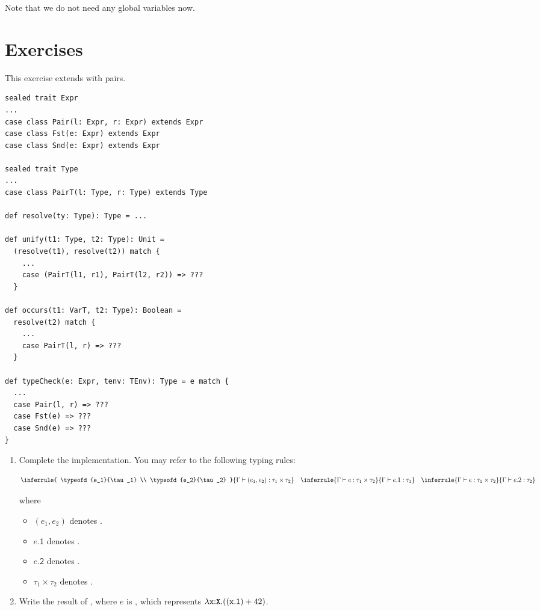 Note that we do not need any global variables now.

\section{Exercises}

\begin{exercise}

This exercise extends \Lang with pairs.

\begin{verbatim}
sealed trait Expr
...
case class Pair(l: Expr, r: Expr) extends Expr
case class Fst(e: Expr) extends Expr
case class Snd(e: Expr) extends Expr

sealed trait Type
...
case class PairT(l: Type, r: Type) extends Type

def resolve(ty: Type): Type = ...

def unify(t1: Type, t2: Type): Unit =
  (resolve(t1), resolve(t2)) match {
    ...
    case (PairT(l1, r1), PairT(l2, r2)) => ???
  }

def occurs(t1: VarT, t2: Type): Boolean =
  resolve(t2) match {
    ...
    case PairT(l, r) => ???
  }

def typeCheck(e: Expr, tenv: TEnv): Type = e match {
  ...
  case Pair(l, r) => ???
  case Fst(e) => ???
  case Snd(e) => ???
}
\end{verbatim}

    \begin{enumerate}
        \item
Complete the implementation.
You may refer to the following typing rules:

\[
\inferrule
{ \typeofd{e_1}{\tau_1} \\ \typeofd{e_2}{\tau_2} }
{ \typeofd{(e_1,e_2)}{\tau_1\times\tau_2} }
\quad
\inferrule
{ \typeofd{e}{\tau_1\times\tau_2} }
{ \typeofd{e\textsf{.1}}{\tau_1} }
\quad
\inferrule
{ \typeofd{e}{\tau_1\times\tau_2} }
{ \typeofd{e\textsf{.2}}{\tau_2} }
\]

where

        \begin{itemize}
        \item $(e_1,e_2)$ denotes .
        \item $e\textsf{.1}$ denotes .
        \item $e\textsf{.2}$ denotes .
        \item $\tau_1\times\tau_2$ denotes .
        \end{itemize}
  \item
    Write the result of , where $e$ is
    ,
    which represents
    $\lambda\texttt{x}{:}\texttt{X}.((\texttt{x}\textsf{.1})+42)$.
\end{enumerate}

\end{exercise}

